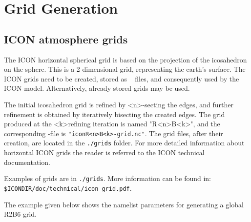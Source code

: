 \section{Grid Generation}
\label{chap:UG_grid_generation}

\subsection{ICON atmosphere grids}

The ICON horizontal spherical grid is based on the projection of the icosahedron on the sphere. This is a 2-dimensional grid, representing the earth's surface. The ICON grids need to be created, stored as \netcdf~ files, and consequently used by the ICON model. Alternatively, already stored grids may be used.

The initial icosahedron grid is refined by \textless n\textgreater -secting the edges, and further refinement is obtained by iteratively bisecting the created edges. The grid produced at the \textless k\textgreater refining iteration is named "R\textless n\textgreater B\textless k\textgreater", and the corresponding \netcdf -file is \verb+"iconR<n>B<k>-grid.nc"+. The grid files, after their creation, are located in the \verb+./grids+ folder. For more detailed information about horizontal ICON grids the reader is referred to the ICON technical documentation.

Examples of grids are in \verb+./grids+. More information can be found in: \\ 
\verb+$ICONDIR/doc/technical/icon_grid.pdf+.


The example given below shows the namelist parameters for generating a global R2B6 grid.

